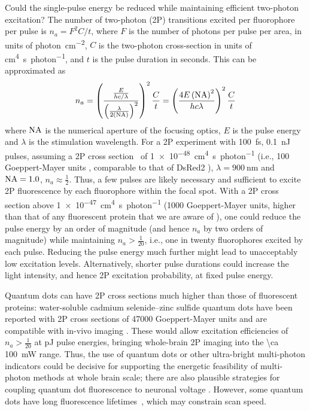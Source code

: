 Could the single-pulse energy be reduced while maintaining efficient two-photon excitation? The number of two-photon (2P) transitions excited per fluorophore per pulse is $n_a = F^2 C / t$, where $F$ is the number of photons per pulse per area, in units of \si{photon\per\centi\meter\squared}, $C$ is the two-photon cross-section in units of \si{\centi\meter\tothe{4}\second\per photon}, and $t$ is the pulse duration in seconds.
This can be approximated as
\[n_a = \left(\frac{\frac{E}{h c / \lambda}}{\left(\frac{\lambda}{2 \left(\text{NA}\right)}\right)^2}\right)^2 \frac{C}{t} = \left(\frac{4E\left(\text{NA}\right)^2}{h c \lambda}\right)^2 \frac{C}{t}\]
where $\text{NA}$ is the numerical aperture of the focusing optics, $E$ is the pulse energy and $\lambda$ is the stimulation wavelength.
For a 2P experiment with \SI{100}{\femto\second}, \SI{0.1}{\nano\joule} pulses, assuming a 2P cross section~\cite{masters06, drobizhev2011} of \SI{1e-48}{\centi\meter\tothe{4}\second\per photon} (i.e., 100 Goeppert-Mayer units \cite{Goeppert-Mayer1931}, comparable to that of DsRed2 \cite{drobizhev2011}), $\lambda=\SI{900}{\nano\meter}$ and $\text{NA}=1.0$, $n_a \approx \frac{1}{2}$.
Thus, a few pulses are likely necessary and sufficient to excite 2P fluorescence by each fluorophore within the focal spot. With a 2P cross section above \SI{1e-47}{\centi\meter\tothe{4}\second\per photon} (1000 Goeppert-Mayer units, higher than that of any fluorescent protein that we are aware of \cite{drobizhev2011}), one could reduce the pulse energy by an order of magnitude (and hence $n_a$ by two orders of magnitude) while maintaining $n_a > \frac{1}{20}$, i.e., one in twenty fluorophores excited by each pulse. Reducing the pulse energy much further might lead to unacceptably low excitation levels. Alternatively, shorter pulse durations could increase the light intensity, and hence 2P excitation probability, at fixed pulse energy. 

Quantum dots can have 2P cross sections much higher than those of fluorescent proteins:  water-soluble cadmium selenide–zinc sulfide quantum dots have been reported with 2P cross sections of 47000 Goeppert-Mayer units and are compatible with in-vivo imaging \cite{Larson30052003}. These would allow excitation efficiencies of $n_a > \frac{1}{20}$ at \si{\pico\joule} pulse energies, bringing whole-brain 2P imaging into the \SI{\ca 100}{\milli\watt} range. Thus, the use of quantum dots or other ultra-bright multi-photon indicators could be decisive for supporting the energetic feasibility of multi-photon methods at whole brain scale; there are also plausible strategies for coupling quantum dot fluorescence to neuronal voltage \cite{Marshall2013}. However, some quantum dots have long fluorescence lifetimes~\cite{Dahan2001}, which may constrain scan speed.

